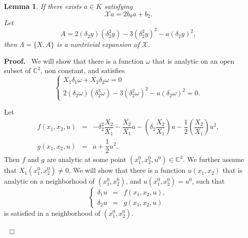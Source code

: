 \documentclass[preprint,12pt]{elsarticle}
\newtheorem{lem}[thm]{Lemma}
\newenvironment{proof}[1][Proof]{\textbf{#1.}\ }{\ $\Box$}
\begin{document}
\begin{lem}
\label{lem:a.15}If there exists $a\in K$ satisfying
\begin{equation} 
\label{eq:a.10} 
\mathscr{X} a = 2 b_0 a  + b_2.
\end{equation}
Let
\begin{equation}
A = 2 (\delta_2 y) (\delta_2^3 y) - 3 (\delta_2^2 y)^2 - a (\delta_2 y)^2,
\end{equation}
then $\Lambda = \{X,A\}$ is a nontrivial expansion of $\mathscr{X}$.
\end{lem}
\begin{proof}
We will show that there is a function $\omega$ that is analytic on an open subset of $\mathbb{C}^2$, non constant,  and satisfies
\begin{equation}
\label{eq:o3}
\left\{
\begin{array}{l}
X_1 \delta_1 \omega + X_2 \delta_2 \omega = 0\\
2 (\delta_2 \omega) (\delta_2^3 \omega) - 3 (\delta_2^2 \omega)^2 - a (\delta_2 \omega)^2 = 0.
\end{array}\right.
\end{equation}

Let
\begin{eqnarray*} 
f(x_1,x_2,u) &=& -\delta_2^2 \dfrac{X_2}{X_1} - \dfrac{X_2}{X_1} a - (\delta_2 \dfrac{X_2}{X_1}) u - \dfrac{1}{2} (\dfrac{X_2}{X_1}) u^2,\\
g(x_1,x_2, u) &=& a + \dfrac{1}{2} u^2.
\end{eqnarray*}
Then $f$ and $g$ are analytic at some point $(x_1^0, x_2^0, u^0)\in \mathbb{C}^3$. We further assume that $X_1(x_1^0, x_2^0)\not=0$. We will show that there is a function $u(x_1,x_2)$ that is analytic on a neighborhood of $(x_1^0,x_2^0)$,  and $u(x_1^0, x_2^0) = u^0$, such that 
\begin{equation}
\label{eq:a.4}
\left\{
\begin{array}{rcl}
\delta_1 u &=& f(x_1,x_2,u),\\
\delta_2 u &=& g(x_1,x_2,u)
\end{array}\right.
\end{equation}
is satisfied in a neighborhood of $(x_1^0,x_2^0)$.



\end{proof}
\end{document}
